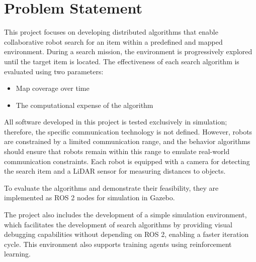 \section{Problem Statement}
\label{sec:problem-statement}

This project focuses on developing distributed algorithms that enable collaborative robot search for an item within a predefined and mapped environment. During a search mission, the environment is progressively explored until the target item is located. The effectiveness of each search algorithm is evaluated using two parameters:

\begin{itemize}
    \item Map coverage over time
    \item The computational expense of the algorithm
\end{itemize}

All software developed in this project is tested exclusively in simulation; therefore, the specific communication technology is not defined. However, robots are constrained by a limited communication range, and the behavior algorithms should ensure that robots remain within this range to emulate real-world communication constraints. Each robot is equipped with a camera for detecting the search item and a LiDAR sensor for measuring distances to objects.

To evaluate the algorithms and demonstrate their feasibility, they are implemented as ROS 2 nodes for simulation in Gazebo.

The project also includes the development of a simple simulation environment, which facilitates the development of search algorithms by providing visual debugging capabilities without depending on ROS 2, enabling a faster iteration cycle. This environment also supports training agents using reinforcement learning.
